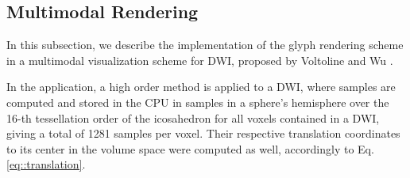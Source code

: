 \documentclass[twoside,twocolumn,10pt]{article}
\begin{document}













\subsection{Multimodal Rendering}
\label{ssec::multimodal}

In this subsection, we describe the implementation of the glyph rendering scheme in a multimodal visualization scheme for DWI, proposed by Voltoline and Wu \cite{voltoline2021}. %





In the application, a high order method is applied to a DWI, where samples are computed and stored in the CPU in samples in a sphere's hemisphere over the 16-th tessellation order of the icosahedron for all voxels contained in a DWI, giving a total of 1281 samples per voxel. Their respective translation coordinates to its center in the volume space were computed as well, accordingly to Eq. \ref{eq::translation}.
\end{document}
